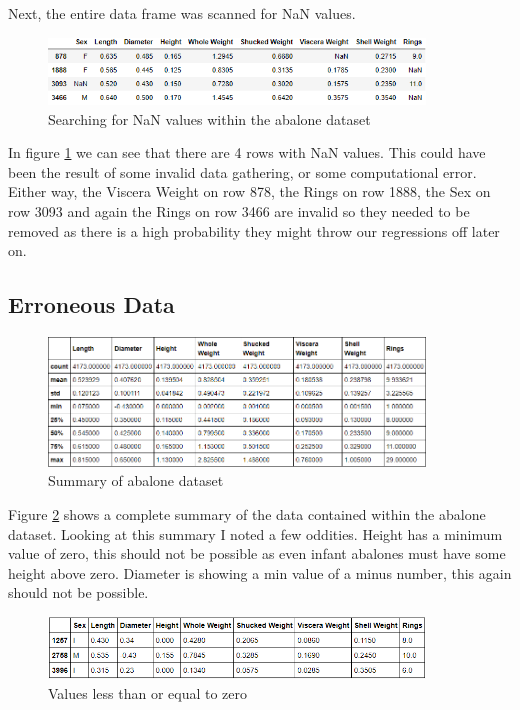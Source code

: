 Next, the entire data frame was scanned for NaN values.

\begin{figure}[H]
  \centering
  \includegraphics[scale=0.5,width=100mm]{./images/abalone-nan.png}
  \caption{Searching for NaN values within the abalone dataset}
  \label{fig:abalones-nan}
\end{figure}

In figure \ref{fig:abalones-nan} we can see that there are 4 rows with NaN values. This could have been the result of some invalid data gathering, or some computational error. Either way, the Viscera Weight on row 878, the Rings on row 1888, the Sex on row 3093 and again the Rings on row 3466 are invalid so they needed to be removed as there is a high probability they might throw our regressions off later on.

\subsection{Erroneous Data}

\begin{figure}[H]
  \centering
  \includegraphics[scale=0.5,width=100mm]{./images/abalone-df-describe.png}
  \caption{Summary of abalone dataset}
  \label{fig:abalones-df-describe}
\end{figure}

Figure \ref{fig:abalones-df-describe} shows a complete summary of the data contained within the abalone dataset. Looking at this summary I noted a few oddities. Height has a minimum value of zero, this should not be possible as even infant abalones must have some height above zero. Diameter is showing a min value of a minus number, this again should not be possible.

\begin{figure}[H]
  \centering
  \includegraphics[scale=0.5,width=100mm]{./images/abalone-less-than-zero.png}
  \caption{Values less than or equal to zero}
  \label{fig:abalones-less-than-zero}
\end{figure}

